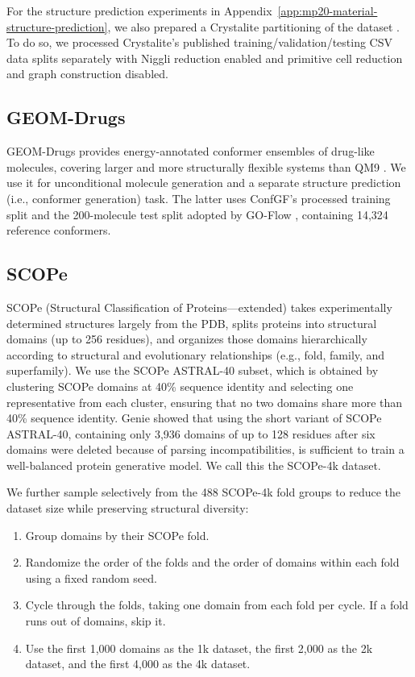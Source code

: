 \documentclass{article} %
\begin{document}
For the structure prediction experiments in Appendix~\ref{app:mp20-material-structure-prediction}, we also prepared a Crystalite partitioning of the dataset \citep{hadziveljkovic2026crystalite}. To do so, we processed Crystalite's published training/validation/testing CSV data splits separately with Niggli reduction enabled and primitive cell reduction and graph construction disabled.

\subsection{GEOM-Drugs}
\label{app:datasets-geom-drugs}

GEOM-Drugs provides energy-annotated conformer ensembles of drug-like molecules,
covering larger and more structurally flexible systems than QM9
\citep{axelrod2022geom}. We use it for unconditional molecule generation and a
separate structure prediction (i.e., conformer generation) task. The latter uses ConfGF's processed training split \citep{shi2021learning} and the 200-molecule test split adopted by GO-Flow \citep{liu2026goflow}, containing 14,324 reference conformers.

\subsection{SCOPe}
\label{app:datasets-scope}

SCOPe (Structural Classification of Proteins---extended)
\citep{chandonia2022scope} takes experimentally determined structures largely
from the PDB, splits proteins into structural domains (up to 256 residues), and
organizes those domains hierarchically according to structural and evolutionary
relationships (e.g., fold, family, and superfamily).
We use the SCOPe ASTRAL-40 subset, which is obtained by clustering SCOPe domains
at 40\% sequence identity and selecting one representative from each cluster,
ensuring that no two domains share more than 40\% sequence identity. Genie
\citep{lin2023genie} showed that using the short variant of SCOPe ASTRAL-40,
containing only 3,936 domains of up to 128 residues after six domains were
deleted because of parsing incompatibilities, is sufficient to train a
well-balanced protein generative model. We call this the SCOPe-4k dataset.

We further sample selectively from the
488 SCOPe-4k fold groups to reduce the dataset size while preserving structural diversity:
\begin{enumerate}
  \item Group domains by their SCOPe fold.
  \item Randomize the order of the folds and the order of domains within each
  fold using a fixed random seed.
  \item Cycle through the folds, taking one domain from each fold per cycle. If
  a fold runs out of domains, skip it.
  \item Use the first 1,000 domains as the 1k dataset, the first 2,000 as the 2k
  dataset, and the first 4,000 as the 4k dataset.
\end{enumerate}
\end{document}
